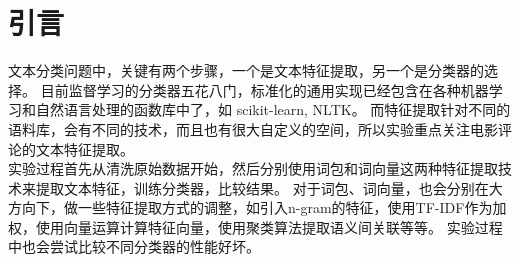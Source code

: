 \section{引言}
文本分类问题中，关键有两个步骤，一个是文本特征提取，另一个是分类器的选择。
目前监督学习的分类器五花八门，标准化的通用实现已经包含在各种机器学习和自然语言处理的函数库中了，如 scikit-learn, NLTK。
而特征提取针对不同的语料库，会有不同的技术，而且也有很大自定义的空间，所以实验重点关注电影评论的文本特征提取。\\
实验过程首先从清洗原始数据开始，然后分别使用词包和词向量这两种特征提取技术来提取文本特征，训练分类器，比较结果。
对于词包、词向量，也会分别在大方向下，做一些特征提取方式的调整，如引入n-gram的特征，使用TF-IDF作为加权，使用向量运算计算特征向量，使用聚类算法提取语义间关联等等。
实验过程中也会尝试比较不同分类器的性能好坏。